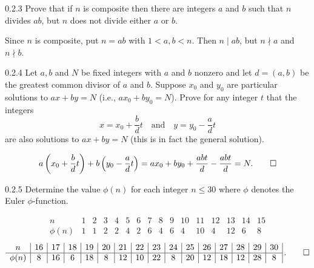 \begin{exercise}{0.2.3}
    Prove that if $n$ is composite then there are integers $a$ and $b$ such that $n$ divides $ab$, but $n$ does not divide either $a$ or $b$.
\end{exercise}

\begin{sol}
    Since $n$ is composite, put $n = ab$ with $1 < a, b < n$.
	Then $n \mid ab$, but $n \nmid a$ and $n \nmid b$.
\end{sol}

\begin{exercise}{0.2.4}
    Let $a, b$ and $N$ be fixed integers with $a$ and $b$ nonzero and let $d = (a, b)$ be the greatest common divisor of $a$ and $b$.
	Suppose $x_0$ and $y_0$ are particular solutions to $ax + by = N$ (i.e., $ax_0 + by_0 = N$).
	Prove for any integer $t$ that the integers
    \[
    	x = x_0 + \frac bdt \quad \text{and} \quad y = y_0 - \frac adt
    \]
    are also solutions to $ax + by = N$ (this is in fact the general solution).

\end{exercise}

\begin{sol}
    \[
        a\left(x_0 + \frac bdt\right) + b\left(y_0 - \frac adt\right) = ax_0 + by_0 + \frac{abt}{d} - \frac{abt}{d} = N. \qedhere
    \]
\end{sol}

\begin{exercise}{0.2.5}
    Determine the value $\phi(n)$ for each integer $n \leq 30$ where $\phi$ denotes the Euler $\phi$-function.
\end{exercise}

\begin{sol}
    \[
        \begin{array}{*{16}{c|}}
            n & 1 & 2 & 3 & 4 & 5 & 6 & 7 & 8 & 9 & 10 & 11 & 12 & 13 & 14 & 15 \\
            \hline
            \phi(n) & 1 & 1 & 2 & 2 & 4 & 2 & 6 & 4 & 6 & 4 & 10 & 4 & 12 & 6 & 8
        \end{array}
    \]
    \[
        \begin{array}{*{16}{c|}}
            n & 16 & 17 & 18 & 19 & 20 & 21 & 22 & 23 & 24 & 25 & 26 & 27 & 28 & 29 & 30 \\
            \hline
            \phi(n) & 8 & 16 & 6 & 18 & 8 & 12 & 10 & 22 & 8 & 20 & 12 & 18 & 12 & 28 & 8
        \end{array}\,. \qedhere
    \]
\end{sol}

